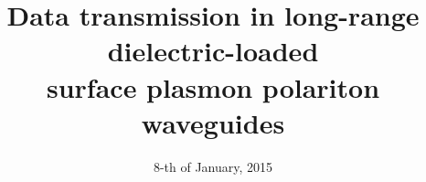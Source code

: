 
\usepackage{graphicx}          %
\usepackage{hyperref}          %
\usepackage{pgf}               %
\usepackage{fancybox}          %
\usepackage{pgfpages}
\usepackage{amsfonts}          %
\usepackage{pifont}            %
\newcommand{\cmark}{\ding{51}}%
\newcommand{\xmark}{\ding{55}}%
\usepackage{xcolor}            %

\graphicspath{ {./img/} }



\title[Data transmission in LR-DLSPPW]
      {Data transmission in long-range dielectric-loaded\\
        surface plasmon polariton waveguides}

\date[Nanometa-2015]{8-th of January, 2015}



